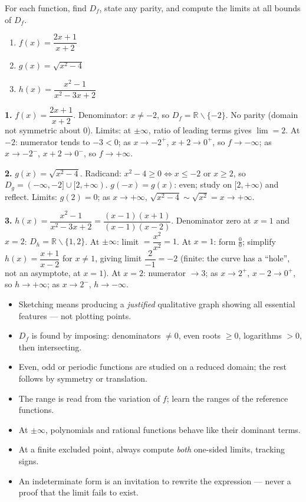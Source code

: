 \documentclass[11pt]{article}
\def\setminus{\mathbin{\backslash}}\let\smallsetminus\setminus
\begin{document}
\begin{exercice}
For each function, find $D_f$, state any parity, and compute the limits at all bounds of $D_f$.
\begin{enumerate}
\item $f(x)=\dfrac{2x+1}{x+2}$
\item $g(x)=\sqrt{x^2-4}$
\item $h(x)=\dfrac{x^2-1}{x^2-3x+2}$
\end{enumerate}
\end{exercice}

\begin{corrige}[Exercise 1]
\textbf{1.} $f(x)=\dfrac{2x+1}{x+2}$. Denominator: $x\neq -2$, so $D_f=\mathbb{R}\setminus\{-2\}$. No parity (domain not symmetric about $0$). Limits: at $\pm\infty$, ratio of leading terms gives $\lim=2$. At $-2$: numerator tends to $-3<0$; as $x\to -2^+$, $x+2\to 0^+$, so $f\to -\infty$; as $x\to -2^-$, $x+2\to 0^-$, so $f\to +\infty$.

\textbf{2.} $g(x)=\sqrt{x^2-4}$. Radicand: $x^2-4\geq 0 \iff x\leq -2$ or $x\geq 2$, so $D_g=(-\infty,-2]\cup[2,+\infty)$. $g(-x)=g(x)$: even; study on $[2,+\infty)$ and reflect. Limits: $g(2)=0$; as $x\to+\infty$, $\sqrt{x^2-4}\sim\sqrt{x^2}=x\to+\infty$.

\textbf{3.} $h(x)=\dfrac{x^2-1}{x^2-3x+2}=\dfrac{(x-1)(x+1)}{(x-1)(x-2)}$. Denominator zero at $x=1$ and $x=2$: $D_h=\mathbb{R}\setminus\{1,2\}$. At $\pm\infty$: limit $=\dfrac{x^2}{x^2}=1$. At $x=1$: form $\frac{0}{0}$; simplify $h(x)=\dfrac{x+1}{x-2}$ for $x\neq 1$, giving limit $\dfrac{2}{-1}=-2$ (finite: the curve has a ``hole'', not an asymptote, at $x=1$). At $x=2$: numerator $\to 3$; as $x\to 2^+$, $x-2\to 0^+$, so $h\to +\infty$; as $x\to 2^-$, $h\to -\infty$.
\end{corrige}

\begin{aretenir}
\begin{itemize}
\item Sketching means producing a \emph{justified} qualitative graph showing all essential features --- not plotting points.
\item $D_f$ is found by imposing: denominators $\neq 0$, even roots $\geq 0$, logarithms $>0$, then intersecting.
\item Even, odd or periodic functions are studied on a reduced domain; the rest follows by symmetry or translation.
\item The range is read from the variation of $f$; learn the ranges of the reference functions.
\item At $\pm\infty$, polynomials and rational functions behave like their dominant terms.
\item At a finite excluded point, always compute \emph{both} one-sided limits, tracking signs.
\item An indeterminate form is an invitation to rewrite the expression --- never a proof that the limit fails to exist.
\end{itemize}
\end{aretenir}
\end{document}
